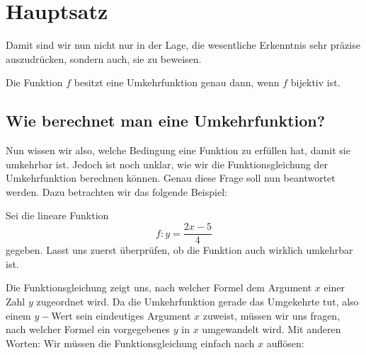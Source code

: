 \documentclass[11pt,oneside]{article}
\begin{document}
\newpage
\section{Hauptsatz}
	Damit sind wir nun nicht nur in der Lage, die wesentliche Erkenntnis sehr präzise auszudrücken, sondern auch, sie zu beweisen.
	\begin{satz}
		Die Funktion $f$  besitzt eine Umkehrfunktion genau dann, wenn $f$  bijektiv ist.
	\end{satz}
	\begin{beweis}
	\end{beweis}

\subsection{Wie berechnet man eine Umkehrfunktion?}
	Nun wissen wir also, welche Bedingung eine Funktion zu erfüllen hat, damit sie umkehrbar ist. Jedoch ist noch unklar, wie wir die Funktionsgleichung der Umkehrfunktion berechnen können. Genau diese Frage soll nun beantwortet werden. Dazu betrachten wir das folgende Beispiel:
	\begin{beispiel}
		Sei die lineare Funktion \[f:y=\frac{2x-5}{4}\] gegeben. Lasst uns zuerst überprüfen, ob die Funktion auch wirklich umkehrbar ist.\vspace{5pt}\newline{}

		Die Funktionsgleichung zeigt uns, nach welcher Formel dem Argument $x$ einer Zahl  $y$ zugeordnet wird. Da die Umkehrfunktion gerade das Umgekehrte tut, also einem $y-$Wert sein eindeutiges Argument $x$ zuweist, müssen wir uns fragen, nach welcher Formel ein vorgegebenes $y$ in $x$ umgewandelt wird. Mit anderen Worten: Wir müssen die Funktionsgleichung einfach nach $x$ auflösen:\vspace{5pt}\newline{}
	\end{beispiel}
\end{document}
